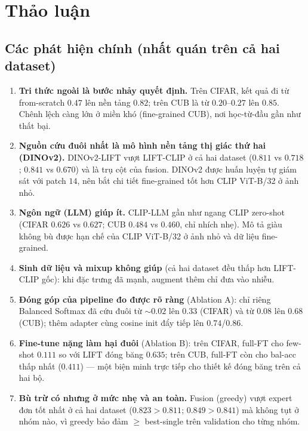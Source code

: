 
\section{Thảo luận}

\subsection{Các phát hiện chính (nhất quán trên cả hai dataset)}
\begin{enumerate}
  \item \textbf{Tri thức ngoài là bước nhảy quyết định.} Trên CIFAR, kết quả đi từ from-scratch
        $0.47$ lên nền tảng $0.82$; trên CUB là từ $0.20$--$0.27$ lên $0.85$. Chênh lệch càng lớn ở
        miền khó (fine-grained CUB), nơi học-từ-đầu gần như thất bại.
  \item \textbf{Nguồn cứu đuôi nhất là mô hình nền tảng thị giác thứ hai (DINOv2).} DINOv2-LIFT
        vượt LIFT-CLIP ở cả hai dataset ($0.811$ vs $0.718$; $0.841$ vs $0.670$) và là trụ cột của
        fusion. DINOv2 được huấn luyện tự giám sát với patch $14$, nên bắt chi tiết fine-grained tốt
        hơn CLIP ViT-B/32 ở ảnh nhỏ.
  \item \textbf{Ngôn ngữ (LLM) giúp ít.} CLIP-LLM gần như ngang CLIP zero-shot
        (CIFAR $0.626$ vs $0.627$; CUB $0.484$ vs $0.460$, chỉ nhích nhẹ). Mô tả giàu không bù được
        hạn chế của CLIP ViT-B/32 ở ảnh nhỏ và dữ liệu fine-grained.
  \item \textbf{Sinh dữ liệu và mixup không giúp} (cả hai dataset đều thấp hơn LIFT-CLIP gốc): khi
        đặc trưng đã mạnh, augment thêm chỉ đưa vào nhiễu.
  \item \textbf{Đóng góp của pipeline đo được rõ ràng} (Ablation A): chỉ riêng Balanced Softmax đã
        cứu đuôi từ $\sim0.02$ lên $0.33$ (CIFAR) và từ $0.08$ lên $0.68$ (CUB); thêm adapter cùng
        cosine init đẩy tiếp lên $0.74$/$0.86$.
  \item \textbf{Fine-tune nặng làm hại đuôi} (Ablation B): trên CIFAR, full-FT cho few-shot $0.111$
        so với LIFT đóng băng $0.635$; trên CUB, full-FT còn cho bal-acc thấp nhất ($0.411$) --- một
        biện minh trực tiếp cho thiết kế đóng băng trên cả hai bộ.
  \item \textbf{Bù trừ có nhưng ở mức nhẹ và an toàn.} Fusion (greedy) vượt expert đơn tốt
        nhất ở cả hai dataset ($0.823>0.811$; $0.849>0.841$) mà không tụt ở nhóm nào, vì greedy bảo
        đảm $\ge$ best-single trên validation cho từng nhóm.
\end{enumerate}

